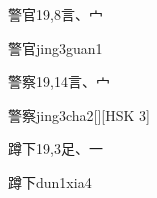\begin{entry}{警官}{19,8}{⾔、⼧}
  \begin{phonetics}{警官}{jing3guan1}
  \end{phonetics}
\end{entry}

\begin{entry}{警察}{19,14}{⾔、⼧}
  \begin{phonetics}{警察}{jing3cha2}[][HSK 3]
  \end{phonetics}
\end{entry}

\begin{entry}{蹲下}{19,3}{⾜、⼀}
  \begin{phonetics}{蹲下}{dun1xia4}
  \end{phonetics}
\end{entry}


